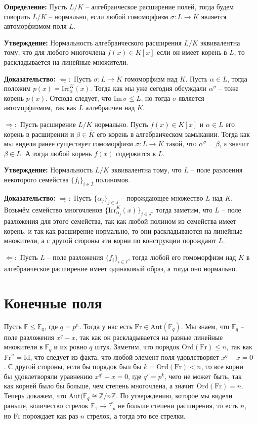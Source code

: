 \documentclass[a4paper, 12pt]{book}
\begin{document}
\textbf{Определение:} Пусть $L/K$ – алгебраическое расширение полей, тогда
будем говорить $L/K$ – нормально, если любой гомоморфизм $\sigma:L\rightarrow
\overline K$ является автоморфизмом поля $L$.

\textbf{Утверждение:} Нормальность алгебраического расширения $L/K$
эквивалентна тому, что для любого многочлена $f(x)\in K[x]$ если он имеет
корень в $L$, то раскладывается на линейные множители.

\textbf{Доказательство:} $\underline{\Leftarrow:}$ Пусть $\sigma: L\rightarrow K$
гомоморфизм над $K$. Пусть $\alpha\in L$, тогда положим $p(x)=\text{Irr}_\alpha^
K(x)$. Тогда как мы уже сегодня обсуждали $\alpha^\sigma$ – тоже корень $p(x)$.
Отсюда следует, что $\text{Im}\,\sigma\le L$, но тогда $\sigma$ является
автоморфизмом, так как $L$ алгебраичен над $K$.

$\underline{\Rightarrow:}$ Пусть расширение $L/K$ нормально. Пусть $f(x)\in K[x]$
и $\alpha\in L$ его корень в расширении и $\beta\in\overline K$ его корень в
алгебраическом замыкании. Тогда как мы видели ранее существует гомоморфизм
$\sigma:L\rightarrow\overline K$ такой, что $\alpha^\sigma=\beta$, а значит
$\beta\in L$. А тогда любой корень $f(x)$ содержится в $L$.

\textbf{Утверждение:} Нормальность $L/K$ эквивалентна тому, что $L$ – поле
разлоения некоторого семейства $\{f_i\}_{i\in I}$ полиномов.

\textbf{Доказательство:} $\underline{\Rightarrow:}$ Пусть $\{\alpha_j\}_{j\in J}$ –
порождающее множество $L$ над $K$. Возьмём семейство многочленов $\{\text{Irr}_
{\alpha_j}^K(x)\}_{j\in J}$, тогда заметим, что $L$ – поле разложения для этого
семейства, так как любой полином из семейства имеет корень, и так как расширение
нормально, то они раскладываются на линейные множители, а с другой стороны эти
корни по конструкции порождают $L$.

$\underline{\Leftarrow:}$ Пусть $L$ – поле разложения $\{f_i\}_{i\in I}$, тогда
любой его гомоморфизм над $K$ в алгебраическое расширение имеет одинаковый образ,
а тогда оно нормально.

\section{Конечные поля}

Пусть $\mathbb{F}\leq\mathbb{F_q}$, где $q=p^n$. Тогда у нас есть $\text{Fr}\in
\text{Aut}(\mathbb{F}_q)$. Мы знаем, что $\mathbb{F}_q$ – поле разложения $x^q-
x$, так как он раскладывается на разные линейные множители в $\mathbb{F}_q$ и
их ровно $q$ штук. Заметим, что порядок $\text{Ord}(\text{Fr})\leq n$, так
как $\text{Fr}^n=\text{Id}$, что следует из факта, что любой элемент поля
удовлетворяет $x^q-x=0$. С другой стороны, если бы порядок был бы $k=\text{Ord}
(\text{Fr})<n$, то все корни бы удовлетворяли уравнению $x^{q'}-x=0$, где $q'=p^k$,
чего не может быть, так как корней было бы больше, чем степень многочлена, а
значит $\text{Ord}(\text{Fr})=n$. Теперь докажем, что $\text{Aut}(\mathbb{F}_q
\cong\mathbb{Z}/n\mathbb{Z}$. По утверждению, которое мы видели раньше,
количество стрелок $\mathbb{F}_1\rightarrow\overline{\mathbb{F}_p}$ не больше
степени расширения, то есть $n$, но $\text{Fr}$ порождает как раз $n$ стрелок,
а тогда это все стрелки.
\end{document}
